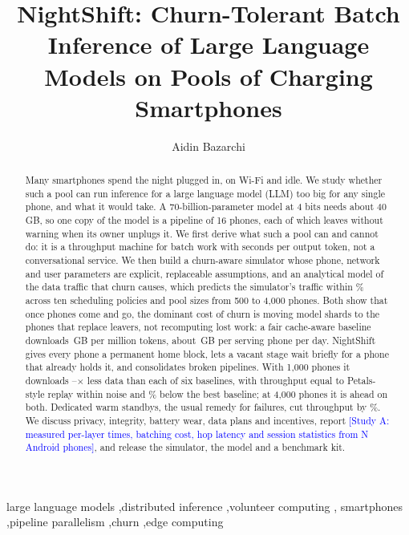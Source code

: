 \documentclass[preprint,review,12pt,authoryear]{elsarticle}
\newcommand{\Pending}[1]{\textcolor{blue}{[#1]}}
\begin{document}
\begin{frontmatter}

\title{NightShift: Churn-Tolerant Batch Inference of Large Language Models on Pools of Charging Smartphones}

\author{Aidin Bazarchi}

\begin{abstract}
Many smartphones spend the night plugged in, on Wi-Fi and idle. We study
whether such a pool can run inference for a large language model (LLM) too big
for any single phone, and what it would take. A 70-billion-parameter model at
4 bits needs about 40\,GB, so one copy of the model is a pipeline of 16 phones,
each of which leaves without warning when its owner unplugs it. We first derive
what such a pool can and cannot do: it is a throughput machine for batch work
with seconds per output token, not a conversational service. We then build a
churn-aware simulator whose phone, network and user parameters are explicit,
replaceable assumptions, and an analytical model of the data traffic that
churn causes, which predicts the simulator's traffic within
\TMErrAbsMaxPct\% across ten scheduling policies and pool sizes from 500 to
4,000 phones. Both show that once phones come and go, the dominant cost of
churn is moving model shards to the phones that replace leavers, not
recomputing lost work: a fair cache-aware baseline downloads \GBCA\,GB per
million tokens, about \PhoneGBCA\,GB per serving phone per day. NightShift
gives every phone a permanent home block, lets a vacant stage wait briefly for
a phone that already holds it, and consolidates broken pipelines. With 1,000
phones it downloads \GBRatioBaseMin--\GBRatioBaseMax$\times$ less data than
each of six baselines, with throughput equal to Petals-style replay within
noise and \NSbehindConsolPct\% below the best baseline; at 4,000 phones it is
ahead on both. Dedicated warm standbys, the usual remedy for failures, cut
throughput by \StandbyDropPct\%. We discuss privacy, integrity, battery wear,
data plans and incentives, report \Pending{Study A: measured per-layer times,
batching cost, hop latency and session statistics from N Android phones}, and
release the simulator, the model and a benchmark kit.
\end{abstract}

\begin{keyword}
large language models \sep distributed inference \sep volunteer computing \sep
smartphones \sep pipeline parallelism \sep churn \sep edge computing
\end{keyword}

\end{frontmatter}
\end{document}
